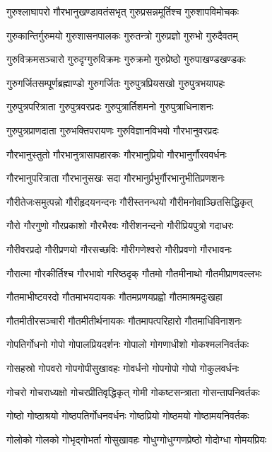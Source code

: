 \twolineshloka
{गुरुश्लाघापरो गौरभानुखण्डावतंसभृत्}%
{गुरुप्रसन्नमूर्तिश्च गुरुशापविमोचकः}%

\twolineshloka
{गुरुकान्तिर्गुरुमयो गुरुशासनपालकः}%
{गुरुतन्त्रो गुरुप्रज्ञो गुरुभो गुरुदैवतम्}%

\twolineshloka
{गुरुविक्रमसञ्चारो गुरुदृग्गुरुविक्रमः}%
{गुरुक्रमो गुरुप्रेष्ठो गुरुपाखण्डखण्डकः}%

\twolineshloka
{गुरुगर्जितसम्पूर्णब्रह्माण्डो गुरुगर्जितः}%
{गुरुपुत्रप्रियसखो गुरुपुत्रभयापहः}%

\twolineshloka
{गुरुपुत्रपरित्राता गुरुपुत्रवरप्रदः}%
{गुरुपुत्रार्तिशमनो गुरुपुत्राधिनाशनः}%

\twolineshloka
{गुरुपुत्रप्राणदाता गुरुभक्तिपरायणः}%
{गुरुविज्ञानविभवो गौरभानुवरप्रदः}%

\twolineshloka
{गौरभानुस्तुतो गौरभानुत्रासापहारकः}%
{गौरभानुप्रियो गौरभानुर्गौरववर्धनः}%

\twolineshloka
{गौरभानुपरित्राता गौरभानुसखः सदा}%
{गौरभानुर्प्रभुर्गौरभानुभीतिप्रणशनः}%

\twolineshloka
{गौरीतेजःसमुत्पन्नो गौरीहृदयनन्दनः}%
{गौरीस्तनन्धयो गौरीमनोवाञ्छितसिद्धिकृत्}%

\twolineshloka
{गौरो गौरगुणो गौरप्रकाशो गौरभैरवः}%
{गौरीशनन्दनो गौरीप्रियपुत्रो गदाधरः}%

\twolineshloka
{गौरीवरप्रदो गौरीप्रणयो गौरसच्छविः}%
{गौरीगणेश्वरो गौरीप्रवणो गौरभावनः}%

\twolineshloka
{गौरात्मा गौरकीर्तिश्च गौरभावो गरिष्ठदृक्}%
{गौतमो गौतमीनाथो गौतमीप्राणवल्लभः}%

\twolineshloka
{गौतमाभीष्टवरदो गौतमाभयदायकः}%
{गौतमप्रणयप्रह्वो गौतमाश्रमदुःखहा}%

\twolineshloka
{गौतमीतीरसञ्चारी गौतमीतीर्थनायकः}%
{गौतमापत्परिहारो गौतमाधिविनाशनः}%

\twolineshloka
{गोपतिर्गोधनो गोपो गोपालप्रियदर्शनः}%
{गोपालो गोगणाधीशो गोकश्मलनिवर्तकः}%

\twolineshloka
{गोसहस्रो गोपवरो गोपगोपीसुखावहः}%
{गोवर्धनो गोपगोपो गोपो गोकुलवर्धनः}%

\twolineshloka
{गोचरो गोचराध्यक्षो गोचरप्रीतिवृद्धिकृत्}%
{गोमी गोकष्टसन्त्राता गोसन्तापनिवर्तकः}%

\twolineshloka
{गोष्ठो गोष्ठाश्रयो गोष्ठपतिर्गोधनवर्धनः}%
{गोष्ठप्रियो गोष्ठमयो गोष्ठामयनिवर्तकः}%

\twolineshloka
{गोलोको गोलको गोभृद्गोभर्ता गोसुखावहः}%
{गोधुग्गोधुग्गणप्रेष्ठो गोदोग्धा गोमयप्रियः}%

